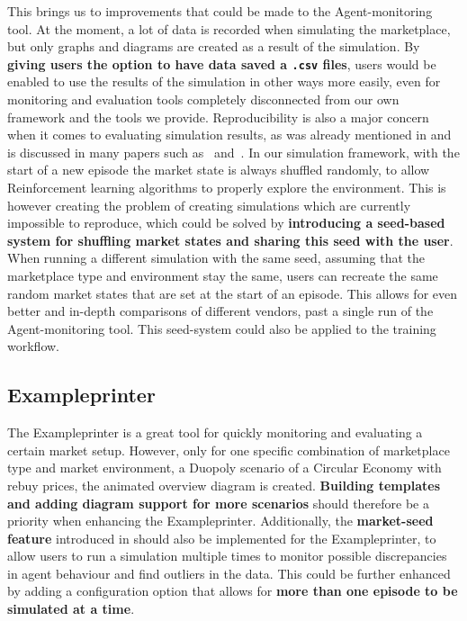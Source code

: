 This brings us to improvements that could be made to the Agent-monitoring tool. At the moment, a lot of data is recorded when simulating the marketplace, but only graphs and diagrams are created as a result of the simulation. By \textbf{giving users the option to have data saved a \texttt{.csv} files}, users would be enabled to use the results of the simulation in other ways more easily, even for monitoring and evaluation tools completely disconnected from our own framework and the tools we provide. Reproducibility is also a major concern when it comes to evaluating simulation results, as was already mentioned in  and is discussed in many papers such as~\cite{DRLThatMatters} and~\cite{ReproducibilityRL}. In our simulation framework, with the start of a new episode the market state is always shuffled randomly, to allow Reinforcement learning algorithms to properly explore the environment. This is however creating the problem of creating simulations which are currently impossible to reproduce, which could be solved by \textbf{introducing a seed-based system for shuffling market states and sharing this seed with the user}. When running a different simulation with the same seed, assuming that the marketplace type and environment stay the same, users can recreate the same random market states that are set at the start of an episode. This allows for even better and in-depth comparisons of different vendors, past a single run of the Agent-monitoring tool. This seed-system could also be applied to the training workflow.

\subsection{Exampleprinter}\label{subsec:FutureExampleprinter}

The Exampleprinter is a great tool for quickly monitoring and evaluating a certain market setup. However, only for one specific combination of marketplace type and market environment, a Duopoly scenario of a Circular Economy with rebuy prices, the animated overview diagram is created. \textbf{Building templates and adding diagram support for more scenarios} should therefore be a priority when enhancing the Exampleprinter. Additionally, the \textbf{market-seed feature} introduced in  should also be implemented for the Exampleprinter, to allow users to run a simulation multiple times to monitor possible discrepancies in agent behaviour and find outliers in the data. This could be further enhanced by adding a configuration option that allows for \textbf{more than one episode to be simulated at a time}.

